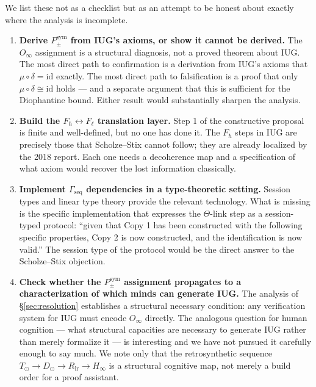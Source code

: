 \documentclass[12pt]{article}
\theoremstyle{plain}
\theoremstyle{definition}
\theoremstyle{remark}
\begin{document}
We list these not as a checklist but as an attempt to be honest about exactly where the
analysis is incomplete.

\begin{enumerate}

\item \textbf{Derive $P_\pm^\text{sym}$ from IUG's axioms, or show it cannot be derived.}
The $O_\infty$ assignment is a structural diagnosis, not a proved theorem about IUG. The
most direct path to confirmation is a derivation from IUG's axioms that $\mu \circ \delta = \text{id}$
exactly. The most direct path to falsification is a proof that only $\mu \circ \delta \cong \text{id}$
holds --- and a separate argument that this is sufficient for the Diophantine bound. Either
result would substantially sharpen the analysis.

\item \textbf{Build the $F_\hbar \leftrightarrow F_\ell$ translation layer.}
Step 1 of the constructive proposal is finite and well-defined, but no one has done it.
The $F_\hbar$ steps in IUG are precisely those that Scholze--Stix cannot follow; they are
already localized by the 2018 report. Each one needs a decoherence map and a specification
of what axiom would recover the lost information classically.

\item \textbf{Implement $\Gamma_\text{seq}$ dependencies in a type-theoretic setting.}
Session types and linear type theory provide the relevant technology. What is missing is the
specific implementation that expresses the $\Theta$-link step as a session-typed protocol:
``given that Copy 1 has been constructed with the following specific properties, Copy 2 is
now constructed, and the identification is now valid.'' The session type of the protocol
would be the direct answer to the Scholze--Stix objection.

\item \textbf{Check whether the $P_\pm^\text{sym}$ assignment propagates to a characterization
of which minds can generate IUG.} The analysis of \S\ref{sec:resolution} establishes a
structural necessary condition: any verification system for IUG must encode $O_\infty$
directly. The analogous question for human cognition --- what structural capacities are
necessary to generate IUG rather than merely formalize it --- is interesting and we have
not pursued it carefully enough to say much. We note only that the retrosynthetic sequence
$T_\odot \to D_\odot \to R_\text{lr} \to H_\infty$ is a structural cognitive map, not
merely a build order for a proof assistant.

\end{enumerate}
\end{document}
